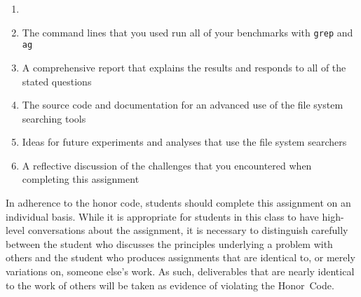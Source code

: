 \begin{enumerate}

  \item 

  \item The command lines that you used run all of your benchmarks with {\tt grep} and {\tt ag} 

  \item A comprehensive report that explains the results and responds to all of the stated questions 

  \item The source code and documentation for an advanced use of the file system searching tools

  \item Ideas for future experiments and analyses that use the file system searchers 

  \item A reflective discussion of the challenges that you encountered when completing this assignment

\end{enumerate}

In adherence to the honor code, students should complete this assignment on an individual basis. While it is appropriate
for students in this class to have high-level conversations about the assignment, it is necessary to distinguish
carefully between the student who discusses the principles underlying a problem with others and the student who produces
assignments that are identical to, or merely variations on, someone else's work.  As such, deliverables that are nearly
identical to the work of others will be taken as evidence of violating the \mbox{Honor Code}.  

  
